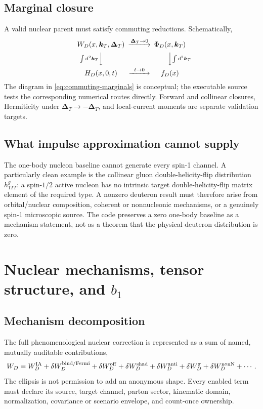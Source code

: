 \documentclass[11pt,oneside]{book}
\newcommand{\kT}{\bm{k}_{T}}
\newcommand{\DeltaT}{\bm{\Delta}_{T}}
\newcommand{\dd}{\mathrm{d}}
\begin{document}
\section{Marginal closure}

A valid nuclear parent must satisfy commuting reductions.  Schematically,
\begin{equation}
 \begin{CD}
 W_D(x,\kT,\DeltaT) @>{\DeltaT\to0}>> \Phi_D(x,\kT)\\
 @V{\int\dd^2\kT}VV @VV{\int\dd^2\kT}V\\
 H_D(x,0,t) @>{t\to0}>> f_D(x)
 \end{CD}
 \label{eq:commuting-marginals}
\end{equation}
The diagram in \cref{eq:commuting-marginals} is conceptual; the executable source tests the corresponding numerical routes directly.  Forward and collinear closures, Hermiticity under $\DeltaT\to-\DeltaT$, and local-current moments are separate validation targets.

\section{What impulse approximation cannot supply}

The one-body nucleon baseline cannot generate every spin-1 channel.  A particularly clean example is the collinear gluon double-helicity-flip distribution $h_{1TT}^g$: a spin-$1/2$ active nucleon has no intrinsic target double-helicity-flip matrix element of the required type.  A nonzero deuteron result must therefore arise from orbital/nuclear composition, coherent or nonnucleonic mechanisms, or a genuinely spin-1 microscopic source.  The code preserves a zero one-body baseline as a mechanism statement, not as a theorem that the physical deuteron distribution is zero.

\chapter{Nuclear mechanisms, tensor structure, and \texorpdfstring{$b_1$}{b1}}
\label{chap:nuclear}

\section{Mechanism decomposition}

The full phenomenological nuclear correction is represented as a sum of named, mutually auditable contributions,
\begin{equation}
 W_D=W_D^{\rm IA}
 +\delta W_D^{\rm bind/Fermi}
 +\delta W_D^{\rm off}
 +\delta W_D^{\rm shad}
 +\delta W_D^{\rm anti}
 +\delta W_D^{\pi}
 +\delta W_D^{\rm nonN}
 +\cdots.
 \label{eq:nuclear-mechanisms}
\end{equation}
The ellipsis is not permission to add an anonymous shape.  Every enabled term must declare its source, target channel, parton sector, kinematic domain, normalization, covariance or scenario envelope, and count-once ownership.
\end{document}
